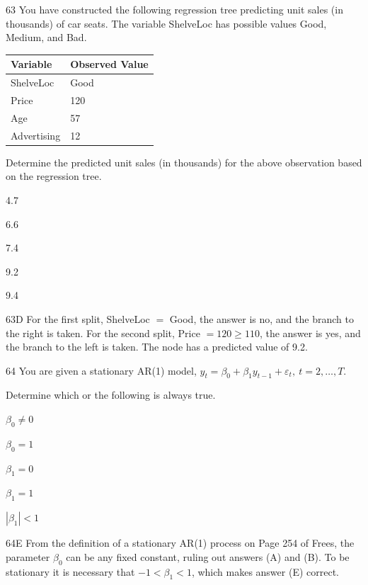 \begin{question}{63}
You have constructed the following regression tree predicting unit sales (in thousands) of car seats. The variable ShelveLoc has possible values Good, Medium, and Bad.


\begin{center}
\begin{tabular}{|l|l|}
\hline
\textbf{Variable} & \textbf{Observed Value} \\ \hline
ShelveLoc & Good \\ \hline
Price & 120 \\ \hline
Age & 57 \\ \hline
Advertising & 12 \\ \hline
\end{tabular}
\end{center}

Determine the predicted unit sales (in thousands) for the above observation based on the regression tree.

\begin{choices}
\item 4.7
\item 6.6
\item 7.4
\item 9.2
\item 9.4
\end{choices}
\end{question}
\begin{solution}{63}{D}
For the first split, ShelveLoc $=$ Good, the answer is no, and the branch to the right is taken. For the second split, Price $= 120 \geqslant 110$, the answer is yes, and the branch to the left is taken. The node has a predicted value of 9.2.
\end{solution}

\begin{question}{64}
You are given a stationary AR(1) model, $y_t = \beta_0 + \beta_1 y_{t-1} + \varepsilon_t,\ t = 2, \ldots, T.$

Determine which or the following is always true.

\begin{choices}
\item $\beta_0 \ne 0$
\item $\beta_0 = 1$
\item $\beta_1 = 0$
\item $\beta_1 = 1$
\item $|\beta_1| < 1$
\end{choices}
\end{question}
\begin{solution}{64}{E}
From the definition of a stationary AR(1) process on Page 254 of Frees, the parameter $\beta_0$ can be any fixed constant, ruling out answers (A) and (B). To be stationary it is necessary that $-1 < \beta_1 < 1$, which makes answer (E) correct.
\end{solution}

